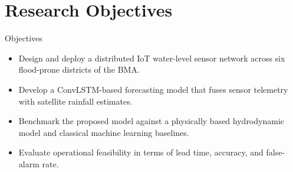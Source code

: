 \section{Research Objectives}
\begin{chulabox}{Objectives}
\begin{itemize}[leftmargin=1.4em]
  \item Design and deploy a distributed IoT water-level sensor network across six flood-prone districts of the BMA.
  \item Develop a ConvLSTM-based forecasting model that fuses sensor telemetry with satellite rainfall estimates.
  \item Benchmark the proposed model against a physically based hydrodynamic model and classical machine learning baselines.
  \item Evaluate operational feasibility in terms of lead time, accuracy, and false-alarm rate.
\end{itemize}
\end{chulabox}
